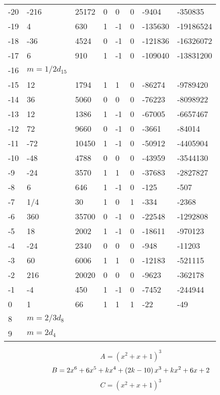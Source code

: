 \documentclass{amsart}
\begin{document}
\begin{longtable}{|l|l|l|lllll|}
-20&-216&25172&0&0&0&-9404&-350835\\
-19&4&630&1&-1&0&-135630&-19186524\\
-18&-36&4524&0&-1&0&-121836&-16326072\\
-17&6&910&1&-1&0&-109040&-13831200\\
-16&$m=1/2d_{15}$&&\multicolumn{5}{c|}{}\\
-15&12&1794&1&1&0&-86274&-9789420\\
-14&36&5060&0&0&0&-76223&-8098922\\
-13&12&1386&1&-1&0&-67005&-6657467\\
-12&72&9660&0&-1&0&-3661&-84014\\
-11&-72&10450&1&-1&0&-50912&-4405904\\
-10&-48&4788&0&0&0&-43959&-3544130\\
-9&-24&3570&1&1&0&-37683&-2827827\\
-8&6&646&1&-1&0&-125&-507\\
-7&1/4&30&1&0&1&-334&-2368\\
-6&360&35700&0&-1&0&-22548&-1292808\\
-5&18&2002&1&-1&0&-18611&-970123\\
-4&-24&2340&0&0&0&-948&-11203\\
-3&60&6006&1&1&0&-12183&-521115\\
-2&216&20020&0&0&0&-9623&-362178\\
-1&-4&450&1&-1&0&-7452&-244944\\
0&1&66&1&1&1&-22&-49\\
8&$m=2/3d_{8}$&&\multicolumn{5}{c|}{}\\
9&$m=2d_{4}$&&\multicolumn{5}{c|}{}\\
\hline
\end{longtable}
$$A=(x^2
 + x
 + 1)^{3}$$
$$B=2\*x^6
 + 6\*x^5
 + k\*x^4
 + \left(2\*k
 - 10\right) \*x^3
 + k\*x^2
 + 6\*x
 + 2$$
$$C=(x^2
 + x
 + 1)^{3}$$
\end{document}
